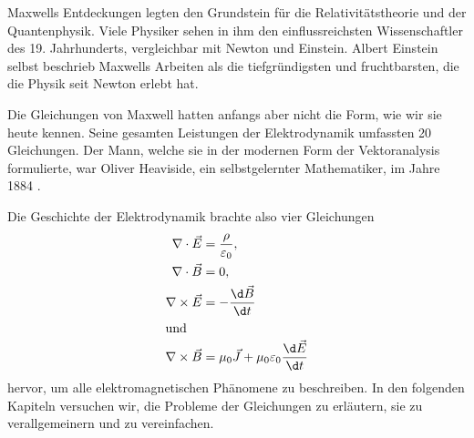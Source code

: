 Maxwells Entdeckungen legten den Grundstein für die Relativitätstheorie und der Quantenphysik.
Viele Physiker sehen in ihm den einflussreichsten Wissenschaftler des 19. Jahrhunderts, vergleichbar mit Newton und Einstein.
Albert Einstein selbst beschrieb Maxwells Arbeiten als die tiefgründigsten und fruchtbarsten, die die Physik seit Newton erlebt hat.

Die Gleichungen von Maxwell hatten anfangs aber nicht die Form, wie wir sie heute kennen. 
Seine gesamten Leistungen der Elektrodynamik umfassten 20 Gleichungen.
Der Mann, welche sie in der modernen Form der Vektoranalysis formulierte, war Oliver Heaviside, ein selbstgelernter Mathematiker, im Jahre 1884 \cite{maxwell:heaviside}.

Die Geschichte der Elektrodynamik brachte also vier Gleichungen
\begin{align*}
	\nabla \cdot \vec{E} &= \frac{\rho}{\varepsilon_0} ,
	\\
	\nabla \cdot \vec{B} &= 0 ,
	\\
	\nabla \times \vec{E} &= - \frac{\d \vec{B}}{\d t} 
	\\
	\intertext{und}
	\nabla \times \vec{B} &= \mu_0 \vec{J} + \mu_0 \varepsilon_0 \frac{\d \vec{E}}{\d t}
\end{align*}
hervor, um alle elektromagnetischen Phänomene zu beschreiben.
In den folgenden Kapiteln versuchen wir, die Probleme der Gleichungen zu erläutern, sie zu verallgemeinern und zu vereinfachen.








